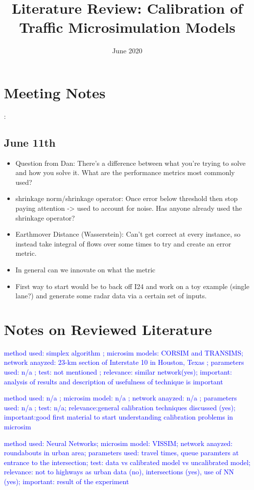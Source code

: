 \documentclass{article}
\title{\textbf{Literature Review: Calibration of Traffic Microsimulation Models}}
\date{June 2020}
\begin{document}
\maketitle
\section{Meeting Notes}:
\subsection{June 11th}
\begin{itemize}
    \item Question from Dan: There's a difference between what you're trying to solve and how you solve it. What are the performance metrics most commonly used?
    \item shrinkage norm/shrinkage operator: Once error below threshold then stop paying attention -> used to account for noise. Has anyone already used the shrinkage operator?
    \item Earthmover Distance (Wasserstein): Can't get correct at every instance, so instead take integral of flows over some times to try and create an error metric. 
    \item In general can we innovate on what the metric 
    \item First way to start would be to back off I24 and work on a toy example (single lane?) and generate some radar data via a certain set of inputs. 
\end{itemize}

\section*{Notes on Reviewed Literature}

\textcolor{blue}{\cite{simplexCalib} method used: simplex algorithm ; microsim models: CORSIM and TRANSIMS; network anayzed: 23-km section of Interstate 10 in Houston, Texas ; parameters used: n/a ; test: not mentioned ; relevance: similar network(yes); important: analysis of results and description of usefulness of technique is important }

\textcolor{blue}{ \cite{prinCalib} method used: n/a ; microsim model: n/a ; network anayzed: n/a ; parameters used: n/a ; test: n/a; relevance:general calibration techniques discussed (yes); important:good first material to start understanding calibration problems in microsim }


\textcolor{blue}{\cite{neuralCalib} method used: Neural Networks; microsim model: VISSIM; network anayzed: roundabouts in urban area; parameters used: travel times, queue paramters at entrance to the intersection; test: data vs calibrated model vs uncalibrated model; relevance: not to highways as urban data (no), intersections (yes), use of NN (yes); important: result of the experiment}
\end{document}
